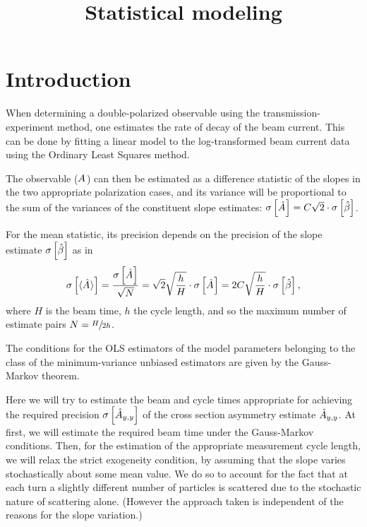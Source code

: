 \documentclass{report}
\begin{document}
\title{Statistical modeling}
\maketitle

\section*{Introduction}
When determining a double-polarized observable using the transmission-experiment method, one estimates the rate of decay of the beam current. This can be done by fitting a linear model to the log-transformed beam current data using the Ordinary Least Squares method.

The observable ($\A$) can then be estimated as a difference statistic of the slopes in the two appropriate polarization cases, and its variance will be proportional to the sum of the variances of the constituent slope estimates: $\SE{\A*} = C\sqrt{2}\cdot\SE{\slp*}$.

For the mean statistic, its precision depends on the precision of the slope estimate $\SE{\slp*}$ as in
\begin{equation}\label{eq:AvgASE}
	\SE{\avg{\A*}} = \frac{\SE{\A*}}{\sqrt N} = \sqrt{2}\sqrt{\frac hH}\cdot\SE{\A*} = 2C\sqrt{\frac hH}\cdot\SE{\slp*},
\end{equation}
where $H$ is the beam time, $h$ the cycle length, and so the maximum number of estimate pairs $N = \sfrac{H}{2h}$.

The conditions for the OLS estimators of the model parameters belonging to the class of the minimum-variance unbiased estimators are given by the Gauss-Markov theorem. 

Here we will try to estimate the beam and cycle times appropriate for achieving the required precision $\SE{\Ayy*}$ of the cross section asymmetry estimate $\Ayy*$. At first, we will estimate the required beam time under the Gauss-Markov conditions. Then, for the estimation of the appropriate measurement cycle length, we will relax the strict exogeneity condition, by assuming that the slope varies stochastically about some mean value. We do so to account for the fact that at each turn a slightly different number of particles is scattered due to the stochastic nature of scattering alone. (However the approach taken is independent of the reasons for the slope variation.)
\end{document}
